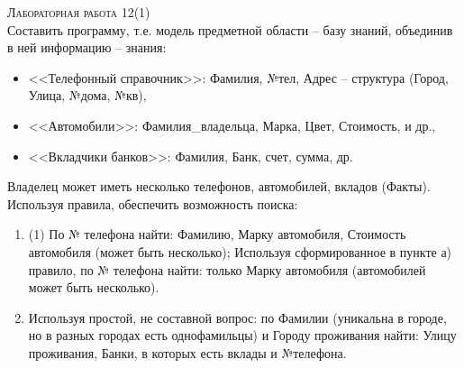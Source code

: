 \textsc{\huge Лабораторная работа 12(1)} \\
Составить программу, т.е. модель предметной области – базу знаний, объединив в ней информацию -- знания:
\begin{itemize}
	\item <<Телефонный справочник>>: Фамилия, №тел, Адрес -- структура (Город, Улица, №дома, №кв),
	\item <<Автомобили>>: Фамилия\_владельца, Марка, Цвет, Стоимость, и др.,
	\item <<Вкладчики банков>>: Фамилия, Банк, счет, сумма, др.
\end{itemize}
Владелец может иметь несколько телефонов, автомобилей, вкладов (Факты). Используя правила, обеспечить возможность поиска:
\begin{enumerate}
	\item \begin{tasks}[label=\asbuk*)](1)
		\task По № телефона найти: Фамилию, Марку автомобиля, Стоимость автомобиля (может быть несколько);
		\task  Используя сформированное в пункте а) правило, по № телефона найти: только Марку автомобиля (автомобилей может быть несколько).
	\end{tasks}
	\item Используя простой, не составной вопрос: по Фамилии (уникальна в городе, но в разных городах есть однофамильцы) и Городу проживания найти:
	Улицу проживания, Банки, в которых есть вклады и №телефона.
\end{enumerate}

